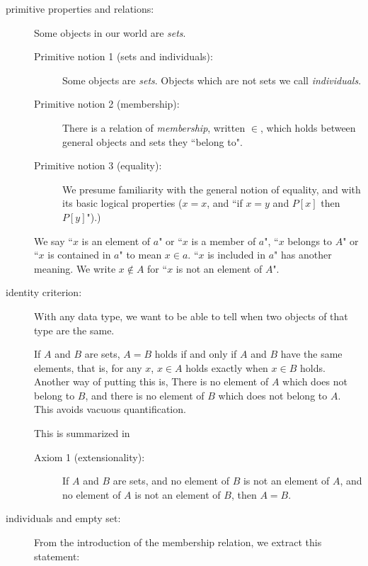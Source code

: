 \documentclass[12pt]{article}
\begin{document}
\begin{description}

\item[primitive properties and relations:]  Some objects in our world are {\em sets\/}.  

\begin{description}

\item[Primitive notion 1 (sets and individuals):]  Some objects are {\em sets\/}.  Objects which are not sets we call {\em individuals\/}.

\item[Primitive notion 2 (membership):]  There is a relation of {\em membership}, written $\in$, which holds between general objects and sets they ``belong to".

\item[Primitive notion 3 (equality):]  We presume familiarity with the general notion of equality, and with its basic logical properties ($x=x$, and ``if $x=y$ and $P[x]$ then $P[y]$").)

\end{description} 

We say ``$x$ is an element of $a$" or ``$x$ is a member of $a$", ``$x$ belongs to $A$" or ``$x$ is contained in $a$" to mean $x \in a$.   ``$x$ is included in $a$" has another meaning.  We write $x \not\in A$ for ``$x$ is not an element of $A$".

\item[identity criterion:]  With any data type, we want to be able to tell when two objects of that type are the same.

If $A$ and $B$ are sets, $A=B$ holds if and only if $A$ and $B$ have the same elements, that is, for any $x$, $x \in A$ holds exactly when $x \in B$ holds.   Another way of putting this is, There is no element of $A$ which does not belong to $B$, and there is no element of $B$ which does not belong to $A$.  This avoids vacuous quantification.

This is summarized in

\begin{description}

\item[Axiom 1 (extensionality):]  If $A$ and $B$ are sets, and no element of $B$ is not an element of $A$, and no element of $A$ is not an element of $B$, then $A=B$.

\end{description}

\item[individuals and empty set:]   From the introduction of the membership relation, we extract this statement:  


\end{description}
\end{document}
